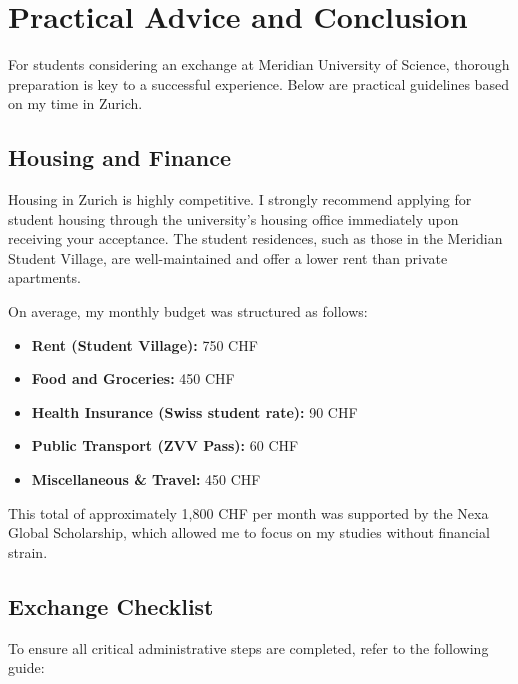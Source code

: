 \section{Practical Advice and Conclusion}
\label{sec:practical_tips}

For students considering an exchange at Meridian University of Science, thorough preparation is key to a successful experience. Below are practical guidelines based on my time in Zurich.

\subsection{Housing and Finance}
Housing in Zurich is highly competitive. I strongly recommend applying for student housing through the university's housing office immediately upon receiving your acceptance. The student residences, such as those in the Meridian Student Village, are well-maintained and offer a lower rent than private apartments.

On average, my monthly budget was structured as follows:
\begin{itemize}
  \item \textbf{Rent (Student Village):} 750 CHF
  \item \textbf{Food and Groceries:} 450 CHF
  \item \textbf{Health Insurance (Swiss student rate):} 90 CHF
  \item \textbf{Public Transport (ZVV Pass):} 60 CHF
  \item \textbf{Miscellaneous \& Travel:} 450 CHF
\end{itemize}
This total of approximately 1,800 CHF per month was supported by the Nexa Global Scholarship, which allowed me to focus on my studies without financial strain.

\subsection{Exchange Checklist}
To ensure all critical administrative steps are completed, refer to the following guide:

